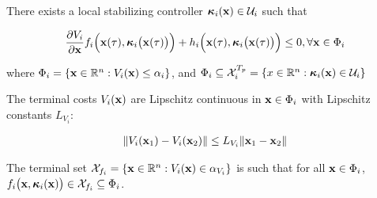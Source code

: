 \begin{gg_box}
\begin{assumption}

  There exists a local stabilizing controller
  $\bm{\mathbf{\kappa}}_i(\bm{\mathbf{x}}) \in \mathcal{U}_i$ such that

  \begin{align}
    \dfrac{\partial V_i}{\partial \bm{\mathbf{x}}} f_i \Big(\bm{\mathbf{x}}(\tau), \bm{\mathbf{\kappa}}_i\big(\bm{\mathbf{x}}(\tau)\big)\Big) +
      h_i\Big(\bm{\mathbf{x}}(\tau), \bm{\mathbf{\kappa}}_i \big(\bm{\mathbf{x}}(\tau)\big)\Big) \leq 0, \forall \bm{\mathbf{x}} \in \Phi_i
  \end{align}

  where $\Phi_i = \{\bm{\mathbf{x}} \in \mathbb{R}^n : V_i(\bm{\mathbf{x}}) \leq \alpha_i \}$, and
  $\Phi_i \subseteq \mathcal{X}_i^{T_p} = \{x \in \mathbb{R}^n : \bm{\mathbf{\kappa}}_i(\bm{\mathbf{x}}) \in \mathcal{U}_i\}$

  \label{ass:local_controller_k}
\end{assumption}
\end{gg_box}


\begin{gg_box}
\begin{assumption}

  The terminal costs $V_i(\bm{\mathbf{x}})$ are Lipschitz continuous in $\bm{\mathbf{x}} \in \Phi_i$
  with Lipschitz constants $L_{V_i}$:

  \begin{align}
    \| V_i(\bm{\mathbf{x}}_1) - V_i(\bm{\mathbf{x}}_2)\| \leq L_{V_i} \|\bm{\mathbf{x}}_1 - \bm{\mathbf{x}}_2 \|
  \end{align}

  \label{ass:V_i_Lipschitz}
\end{assumption}
\end{gg_box}


\begin{gg_box}
\begin{assumption}

  The terminal set $\mathcal{X}_{f_i} = \{ \bm{\mathbf{x}} \in \mathbb{R}^n : V_i(\bm{\mathbf{x}}) \in \alpha_{V_i}\}$
  is such that for all $\bm{\mathbf{x}} \in \Phi_i$, $f_i\big(\bm{\mathbf{x}}, \bm{\mathbf{\kappa}}_i(\bm{\mathbf{x}})\big) \in \mathcal{X}_{f_i} \subseteq \Phi_i$.

  \label{ass:x_f_i}
\end{assumption}
\end{gg_box}
